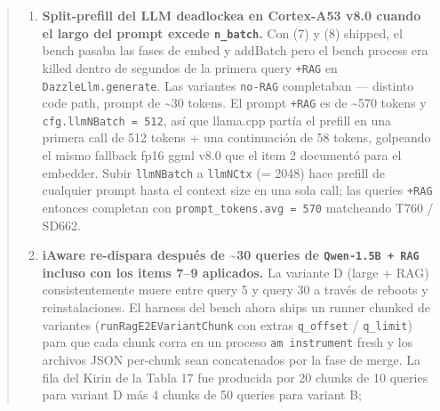 \begin{quote}
\begin{enumerate}
  0.235 en los chips HNSW) porque \texttt{RagE2EBenchPhases.ensureServerRunning}
  arrancaba Valkey sin \texttt{DazzleModule.VectorSearch}, así que
  \texttt{FT.CREATE} no tenía handler y el schema per-index nunca aterrizaba en
  \texttt{g\_indexes} --- \texttt{addBatchDirect} / \texttt{searchDirect}
  JNI-direct retornaban en silencio con 0 hits. Con el módulo cargado, la
  siguiente capa del bug emergió: el SIMD distance kernel de
  \texttt{BruteforceSearch::searchKnn} de hnswlib segfaultea sobre loads NEON
  16-byte misaligned sobre el stride packed \texttt{{[}vec,\ label{]}} que
  hnswlib usa, en Cortex-A53 + libstdc++ Bionic. El fix mirrorea cada vector del
  path FLAT en \texttt{schema-\textgreater{}fp32\_store} y reemplaza
  \texttt{searchKnn} con un scan brute-force escalar portable;
  \textasciitilde2.5 ms por query sobre N = 2 000, dim = 384 en Cortex-A53. El
  path HNSW no cambia.
\item
  \textbf{Split-prefill del LLM deadlockea en Cortex-A53 v8.0 cuando el largo
  del prompt excede \texttt{n\_batch}.} Con (7) y (8) shipped, el bench pasaba
  las fases de embed y addBatch pero el bench process era killed dentro de
  segundos de la primera query \texttt{+RAG} en \texttt{DazzleLlm.generate}. Las
  variantes \texttt{no-RAG} completaban --- distinto code path, prompt de
  \textasciitilde30 tokens. El prompt \texttt{+RAG} es de \textasciitilde570
  tokens y \texttt{cfg.llmNBatch\ =\ 512}, así que llama.cpp partía el prefill
  en una primera call de 512 tokens + una continuación de 58 tokens, golpeando
  el mismo fallback fp16 ggml v8.0 que el item 2 documentó para el embedder.
  Subir \texttt{llmNBatch} a \texttt{llmNCtx} (= 2048) hace prefill de cualquier
  prompt hasta el context size en una sola call; las queries \texttt{+RAG}
  entonces completan con \texttt{prompt\_tokens.avg\ =\ 570} matcheando T760 /
  SD662.
\item
  \textbf{iAware re-dispara después de \textasciitilde30 queries de
  \texttt{Qwen-1.5B\ +\ RAG} incluso con los items 7--9 aplicados.} La variante
  D (large + RAG) consistentemente muere entre query 5 y query 30 a través de
  reboots y reinstalaciones. El harness del bench ahora ships un runner chunked
  de variantes (\texttt{runRagE2EVariantChunk} con extras \texttt{q\_offset} /
  \texttt{q\_limit}) para que cada chunk corra en un proceso
  \texttt{am\ instrument} fresh y los archivos JSON per-chunk sean concatenados
  por la fase de merge. La fila del Kirin de la Tabla 17 fue producida por 20
  chunks de 10 queries para variant D más 4 chunks de 50 queries para variant B;

\end{enumerate}
\end{quote}
